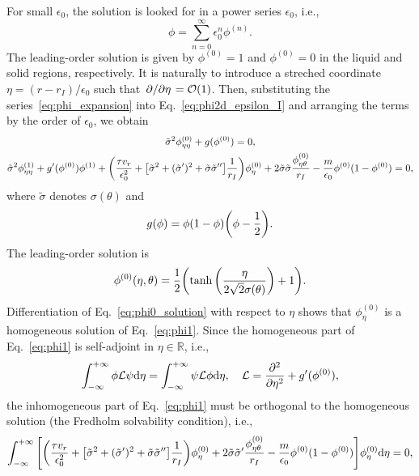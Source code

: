 \documentclass{article}
\begin{document}
For small $\epsilon_0$, the solution is looked for in a power series $\epsilon_0$, i.e.,
\begin{equation}\label{eq:phi_expansion}
    \phi = \sum_{n=0}^{\infty} \epsilon_0^n \phi^{(n)}.
\end{equation}
The leading-order solution is given by $\phi^{(0)}=1$ and $\phi^{(0)}=0$ in the liquid and solid regions, respectively.
It is naturally to introduce a streched coordinate $\eta = (r-r_I)/\epsilon_0$ such that $\pdv*{\eta} = \order{1}$.
Then, substituting the series~\eqref{eq:phi_expansion} into Eq.~\eqref{eq:phi2d_epsilon_I}
and arranging the terms by the order of $\epsilon_0$, we obtain
\begin{gather}
    \tilde\sigma^2\phi^{(0)}_{\eta\eta} + g(\phi^{(0)}) = 0, \label{eq:phi0}\\
    \tilde\sigma^2\phi^{(1)}_{\eta\eta} + g'(\phi^{(0)})\phi^{(1)} + \qty(
        \frac{\tau v_r}{\epsilon_0^2} + \qty[\tilde\sigma^2 + (\tilde\sigma')^2 + \tilde\sigma\tilde\sigma'']\frac1{r_I}
    )\phi^{(0)}_\eta + 2\tilde\sigma\tilde\sigma\frac{\phi^{(0)}_{\eta\theta}}{r_I}
    - \frac{m}{\epsilon_0}\phi^{(0)}(1-\phi^{(0)}) = 0, \label{eq:phi1}
\end{gather}
where $\tilde\sigma$ denotes $\sigma(\theta)$ and
\begin{equation}\label{eq:g}
    g(\phi) = \phi(1-\phi)\qty(\phi - \frac12).
\end{equation}
The leading-order solution is
\begin{equation}\label{eq:phi0_solution}
    \phi^{(0)}(\eta,\theta) = \frac12\qty( \tanh\qty(\frac{\eta}{2\sqrt2\sigma(\theta)}) + 1 ).
\end{equation}
Differentiation of Eq.~\eqref{eq:phi0_solution} with respect to $\eta$ shows that $\phi^{(0)}_\eta$
is a homogeneous solution of Eq.~\eqref{eq:phi1}.
Since the homogeneous part of Eq.~\eqref{eq:phi1} is self-adjoint in $\eta\in\mathbb{R}$, i.e.,
\begin{equation}\label{eq:phi0_self-adjoint}
    \int_{-\infty}^{+\infty} \phi\mathcal{L}\psi\dd\eta = \int_{-\infty}^{+\infty} \psi\mathcal{L}\phi\dd\eta, \quad
    \mathcal{L} = \pdv[2]{\eta} + g'(\phi^{(0)}),
\end{equation}
the inhomogeneous part of Eq.~\eqref{eq:phi1} must be orthogonal to the homogeneous solution
(the Fredholm solvability condition), i.e.,
\begin{equation}\label{eq:phi1_solvability}
    \int_{-\infty}^{+\infty} \qty[
        \qty(
            \frac{\tau v_r}{\epsilon_0^2} + \qty[\tilde\sigma^2 + (\tilde\sigma')^2 + \tilde\sigma\tilde\sigma'']\frac1{r_I}
        )\phi^{(0)}_\eta + 2\tilde\sigma\tilde\sigma'\frac{\phi^{(0)}_{\eta\theta}}{r_I}
        - \frac{m}{\epsilon_0}\phi^{(0)}(1-\phi^{(0)})
    ]\phi^{(0)}_\eta \dd\eta = 0,
\end{equation}
\end{document}
